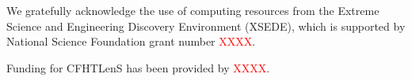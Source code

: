 \documentclass[useAMS,usenatbib]{mn2e}
\begin{document}
We gratefully acknowledge the use of computing resources
from the Extreme Science and Engineering Discovery Environment (XSEDE),
which is supported by National Science Foundation grant number
\textcolor{red}{XXXX}.

Funding for CFHTLenS has been provided by
\textcolor{red}{XXXX}.





\bsp

\label{lastpage}
\end{document}
